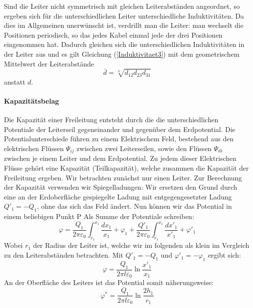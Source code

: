 Sind die Leiter nicht symmetrisch mit gleichen Leiterabständen angeordnet, so ergeben sich für die unterschiedlichen Leiter unterschiedliche Induktivitäten. Da dies im Allgemeinen unerwünscht ist, verdrillt man die Leiter: man wechselt die Positionen periodisch, so das jedes Kabel einmal jede der drei Positionen eingenommen hat. Dadurch gleichen sich die unterschiedlichen Induktivitäten in der Leiter aus und es gilt Gleichung (\ref{Induktivitaet3}) mit dem geometrischem Mittelwert der Leiterabstände
\begin{equation}
\bar{d} = \sqrt[3]{d_{12}d_{23}d_{31}}
\end{equation}
anstatt $d$.

\paragraph{Kapazitätsbelag}
 Die Kapazität einer Freileitung entsteht durch die die unterschiedlichen Potentiale der Leiterseil gegeneinander und gegenüber dem Erdpotential. Die Potentialunterschiede führen zu einem Elektrischem Feld, bestehend aus den elektrischen Flüssen $\Psi_{ij}$ zwischen zwei Leiterseilen, sowie den Flüssen $\Psi_{i0}$ zwischen je einem Leiter und dem Erdpotential. Zu jedem dieser Elektrischen Flüsse gehört eine Kapazität (Teilkapazität), welche zusammen die Kapazität der Freileitung ergeben.
Wir betrachten zunächst nur einen Leiter. Zur Berechnung der Kapazität verwenden wir Spiegelladungen: Wir ersetzen den Grund durch eine an der Erdoberfläche gespiegelte Ladung mit entgegengesetzter Ladung $Q'_1 = - Q_1$, ohne das sich das Feld ändert. Nun können wir das Potential in einem beliebigen Punkt P Als Summe der Potentiale schreiben:
\begin{equation}
\varphi = \frac{Q_1}{2\pi\varepsilon_0} \int^{x_1}_{r_1} \frac{dx_1}{x_1} + \varphi_1 + \frac{Q'_1}{2\pi\varepsilon_0} \int^{x_1}_{r_1} \frac{dx'_1}{x'_1} + \varphi'_1
\end{equation}
Wobei $r_1$ der Radius der Leiter ist, welche wir im folgenden als klein im Vergleich zu den Leiterabständen betrachten. Mit $Q'_1 = - Q_1$ und $\varphi'_1 = - \varphi_1$ ergibt sich:
\begin{equation}\label{einleitungsfeld}
\varphi = \frac{Q_1}{2\pi l\varepsilon_0} \ln \frac{x'_1}{x_1}
\end{equation}
An der Oberfläche des Leiters ist das Potential somit näherungsweise:
\begin{equation}
\varphi^* = \frac{Q_1}{2\pi l\varepsilon_0} \ln \frac{2h_1}{r_1}
\end{equation}
